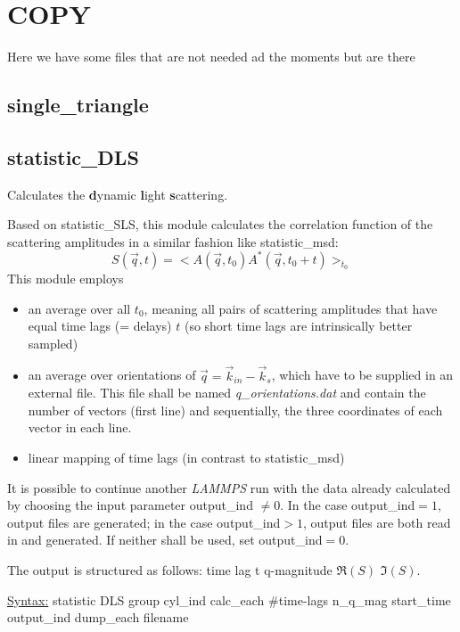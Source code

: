 \documentclass[a4paper,10pt]{scrreprt}
\begin{document}
\section{COPY}

Here we have some files that are not needed ad the moments but are there

\subsection{single\_triangle}

\subsection{statistic\_DLS}

Calculates the \textbf{d}ynamic \textbf{l}ight \textbf{s}cattering.

Based on statistic\_SLS, this module calculates the correlation function of the scattering amplitudes in a similar fashion like statistic\_msd:
%
\begin{equation}
S(\vec{q}, t) = < A(\vec{q},t_0)A^*(\vec{q},t_0+t) >_{t_0}
\label{eq:DLS}
\end{equation}
%
This module employs
%
\begin{itemize}
\item an average over all $t_0$, meaning all pairs of scattering amplitudes that have equal time lags (= delays) $t$ (so short time lags are intrinsically better sampled)
\item an average over orientations of $\vec{q} = \vec{k}_{in} - \vec{k}_{s}$, which have to be supplied in an external file. This file shall be named \textit{q\_orientations.dat} and contain the number of vectors (first line) and sequentially, the three coordinates of each vector in each line.
\item linear mapping of time lags (in contrast to statistic\_msd)
\end{itemize}
%
It is possible to continue another \textit{LAMMPS} run with the data already calculated by choosing the input parameter output\_ind $\neq 0$. In the case output\_ind$=1$, output files are generated; in the case output\_ind$>1$, output files are both read in and generated. If neither shall be used, set output\_ind$=0$.

The output is structured as follows: time lag t \quad q-magnitude \quad $\mathfrak{R} (S)$ \quad $\mathfrak{I} (S)$.

\underline{Syntax:} statistic	DLS group cyl\_ind calc\_each \#time-lags n\_q\_mag start\_time output\_ind dump\_each filename
\end{document}

